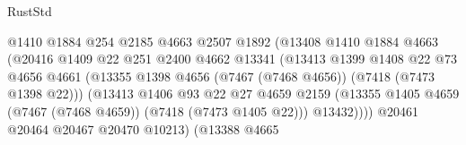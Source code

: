 \begin{lexlean}{RustStd}
\begin{coremodule}
                                        @1410
                                        @1884
                                        @254
                                        @2185
                                        @4663
                                        @2507
                                        @1892
                                        (@13408
                                          @1410
                                          @1884
                                          @4663
                                          (@20416
                                            @1409
                                            @22
                                            @251
                                            @2400
                                            @4662
                                            @13341
                                            (@13413
                                              @1399
                                              @1408
                                              @22
                                              @73
                                              @4656
                                              @4661
                                              (@13355
                                                @1398
                                                @4656
                                                (@7467 (@7468 @4656))
                                                (@7418 (@7473 @1398 @22)))
                                              (@13413
                                                @1406
                                                @93
                                                @22
                                                @27
                                                @4659
                                                @2159
                                                (@13355
                                                  @1405
                                                  @4659
                                                  (@7467 (@7468 @4659))
                                                  (@7418 (@7473 @1405 @22)))
                                                @13432))))
                                        @20461
                                        @20464
                                        @20467
                                        @20470
                                        @10213)
                                      (@13388
                                        @4665

\end{coremodule}
\end{lexlean}
